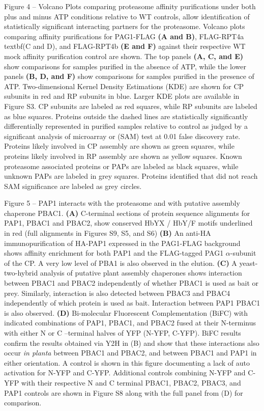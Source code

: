 Figure 4 – Volcano Plots comparing proteasome affinity purifications under both plus and minus ATP conditions relative to WT controls, allow identification of statistically significant interacting partners for the proteasome. Volcano plots comparing affinity purifications for PAG1-FLAG \textbf{(A and B)}, FLAG-RPT4a textbf{(C and D)}, and FLAG-RPT4b \textbf{(E and F)} against their respective WT mock affinity purification control are shown. The top panels \textbf{(A, C, and E)} show comparisons for samples purified in the absence of ATP, while the lower panels \textbf{(B, D, and F)} show comparisons for samples purified in the presence of ATP. Two-dimensional Kernel Density Estimations (KDE) are shown for CP subunits in red and RP subunits in blue. Larger KDE plots are available in Figure S3. CP subunits are labeled as red squares, while RP subunits are labeled as blue squares. Proteins outside the dashed lines are statistically significantly differentially represented in purified samples relative to control as judged by a significant analysis of microarray or (SAM) test at 0.01 false discovery rate. Proteins likely involved in CP assembly are shown as green squares, while proteins likely involved in RP assembly are shown as yellow squares. Known proteasome associated proteins or PAPs are labeled as black squares, while unknown PAPs are labeled in grey squares. Proteins identified that did not reach SAM significance are labeled as grey circles.

Figure 5 – PAP1 interacts with the proteasome and with putative assembly chaperone PBAC1. \textbf{(A)} C-terminal sections of protein sequence alignments for PAP1, PBAC1 and PBAC2, show conserved HbYX / HbY/F motifs underlined in red (full alignments in Figures S9, S5, and S6) \textbf{(B)} An anti-HA immunopurification of HA-PAP1 expressed in the PAG1-FLAG background shows affinity enrichment for both PAP1 and the FLAG-tagged PAG1 $\alpha$-subunit of the CP. A very low level of PBA1 is also observed in the elution. \textbf{(C)} A yeast-two-hybrid analysis of putative plant assembly chaperones shows interaction between PBAC1 and PBAC2 independently of whether PBAC1 is used as bait or prey. Similarly, interaction is also detected between PBAC3 and PBAC4 independently of which protein is used as bait. Interaction between PAP1 PBAC1 is also observed. \textbf{(D)} Bi-molecular Fluorescent Complementation (BiFC) with indicated combinations of PAP1, PBAC1, and PBAC2 fused at their N-terminus with either N or C –terminal halves of YFP (N-YFP, C-YFP). BiFC results confirm the results obtained via Y2H in (B) and show that these interactions also occur \textit{in planta} between PBAC1 and PBAC2, and between PBAC1 and PAP1 in either orientation. A control is shown in this figure documenting a lack of auto activation for N-YFP and C-YFP. Additional controls combining N-YFP and C-YFP with their respective N and C terminal PBAC1, PBAC2, PBAC3, and PAP1 controls are shown in Figure S8 along with the full panel from (D) for comparison.

